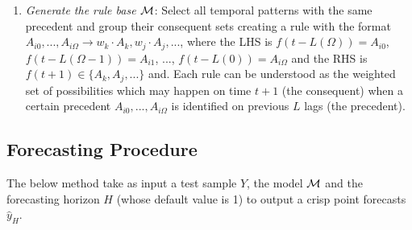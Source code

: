 \begin{enumerate}
\begin{enumerate}
\item \textit{Generate the rule base $\mathcal{M}$}: Select all temporal patterns with the same precedent and group their consequent sets  creating a rule with the format $A_{i0},...,A_{i\Omega} \rightarrow w_k \cdot A_k, w_j \cdot A_j,...$, where the LHS is $f(t - L(\Omega)) = A_{i0}$, $f(t - L(\Omega-1)) = A_{i1}$, ..., $f(t - L(0)) = A_{i\Omega}$ and the RHS is $f(t+1) \in \{A_k, A_j,...\}$ and. Each rule can be understood as the weighted set of possibilities which may happen on time $t+1$ (the consequent) when a certain precedent $A_{i0},...,A_{i\Omega}$ is identified on previous $L$ lags (the precedent).
\end{enumerate}
\end{enumerate}

%
\subsection{Forecasting Procedure} 
\label{sec:fts_forecasting_procedure}

The below method take as input a test sample $Y$, the model $\mathcal{M}$ and the forecasting horizon $H$ (whose default value is 1) to output a crisp point forecasts $\hat{y}_H$.

